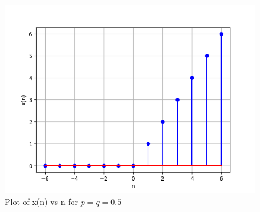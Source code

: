 \documentclass[journal,12pt,twocolumn]{IEEEtran}
\theoremstyle{remark}
\begin{document}
\begin{figure}[!h]
    \centering
    \includegraphics[width = \columnwidth]{figs/x_plot.png}
    \caption{Plot of x(n) vs n for $p=q=0.5$}
    \label{fig:1}
\end{figure}
\end{document}
